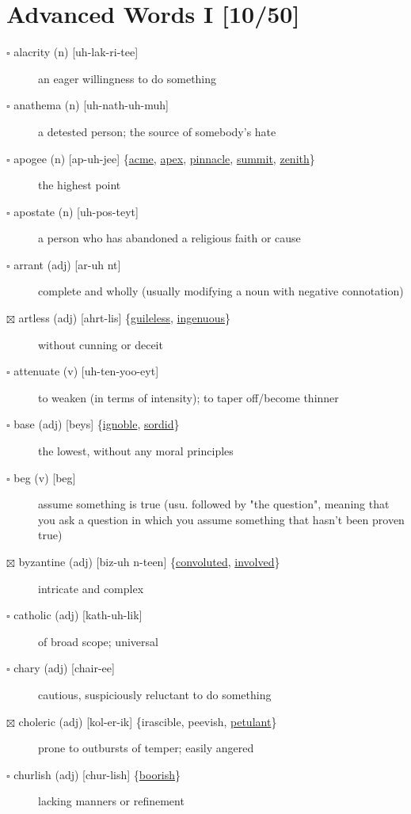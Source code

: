 \documentclass[11pt]{article}
\begin{document}
\section{Advanced Words I [10/50]}
\label{sec:org37f8cd9}
\begin{description}
\item[{$\square$ alacrity (n) [uh-lak-ri-tee]}] an eager willingness to do something
\item[{$\square$ anathema (n) [uh-nath-uh-muh]}] a detested person; the source of somebody's hate
\item[{$\square$ \label{orge7e78f1}apogee (n) [ap-uh-jee] \{\hyperref[orgcd04c21]{acme}, \hyperref[org6b46e9e]{apex}, \hyperref[orgc8167b5]{pinnacle}, \hyperref[org9cb55e7]{summit}, \hyperref[org79910cc]{zenith}\}}] the highest point
\item[{$\square$ apostate (n) [uh-pos-teyt]}] a person who has abandoned a religious faith or cause
\item[{$\square$ arrant (adj) [ar-uh nt]}] complete and wholly (usually modifying a noun with negative connotation)
\item[{$\boxtimes$ \label{orgc958c7d}artless (adj) [ahrt-lis] \{\hyperref[orgc2431f3]{guileless}, \hyperref[org3f15685]{ingenuous}\}}] without cunning or deceit
\item[{$\square$ attenuate (v) [uh-ten-yoo-eyt]}] to weaken (in terms of intensity); to taper off/become thinner
\item[{$\square$ \label{org3f59f0a}base (adj) [beys] \{\hyperref[orgda18690]{ignoble}, \hyperref[org6a88c2e]{sordid}\}}] the lowest, without any moral principles
\item[{$\square$ beg (v) [beg]}] assume something is true (usu. followed by "the question", meaning that you ask a question in which you assume something that hasn't been proven true)
\item[{$\boxtimes$ \label{org15ac659}byzantine (adj) [biz-uh n-teen] \{\hyperref[org2ba5d5b]{convoluted}, \hyperref[org59ec861]{involved}\}}] intricate and complex
\item[{$\square$ catholic (adj) [kath-uh-lik]}] of broad scope; universal
\item[{$\square$ chary (adj) [chair-ee]}] cautious, suspiciously reluctant to do something
\item[{$\boxtimes$ choleric (adj) [kol-er-ik] \{irascible, peevish, \hyperref[org344341c]{petulant}\}}] prone to outbursts of temper; easily angered
\item[{$\square$ \label{orgbee7def}churlish (adj) [chur-lish] \{\hyperref[org50a170f]{boorish}\}}] lacking manners or refinement

\end{description}
\end{document}
